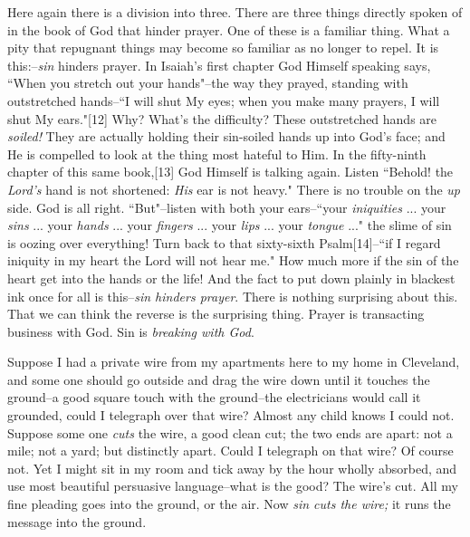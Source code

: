 Here again there is a division into three. There are three things directly
spoken of in the book of God that hinder prayer. One of these is a
familiar thing. What a pity that repugnant things may become so familiar
as no longer to repel. It is this:--\textit{sin} hinders prayer. In Isaiah's
first chapter God Himself speaking says, ``When you stretch out your
hands"--the way they prayed, standing with outstretched hands--``I will
shut My eyes; when you make many prayers, I will shut My ears."[12] Why?
What's the difficulty? These outstretched hands are \textit{soiled!} They are
actually holding their sin-soiled hands up into God's face; and He is
compelled to look at the thing most hateful to Him. In the fifty-ninth
chapter of this same book,[13] God Himself is talking again. Listen
``Behold! the \textit{Lord's} hand is not shortened: \textit{His} ear is not heavy."
There is no trouble on the \textit{up} side. God is all right. ``But"--listen with
both your ears--``your \textit{iniquities} ... your \textit{sins} ... your \textit{hands} ...
your \textit{fingers} ... your \textit{lips} ... your \textit{tongue} ..." the slime of sin is
oozing over everything! Turn back to that sixty-sixth Psalm[14]--``if I
regard iniquity in my heart the Lord will not hear me." How much more if
the sin of the heart get into the hands or the life! And the fact to put
down plainly in blackest ink once for all is this--\textit{sin hinders prayer}.
There is nothing surprising about this. That we can think the reverse is
the surprising thing. Prayer is transacting business with God. Sin is
\textit{breaking with God}.

Suppose I had a private wire from my apartments here to my home in
Cleveland, and some one should go outside and drag the wire down until it
touches the ground--a good square touch with the ground--the electricians
would call it grounded, could I telegraph over that wire? Almost any child
knows I could not. Suppose some one \textit{cuts} the wire, a good clean cut; the
two ends are apart: not a mile; not a yard; but distinctly apart. Could I
telegraph on that wire? Of course not. Yet I might sit in my room and tick
away by the hour wholly absorbed, and use most beautiful persuasive
language--what is the good? The wire's cut. All my fine pleading goes into
the ground, or the air. Now \textit{sin cuts the wire;} it runs the message into
the ground.

